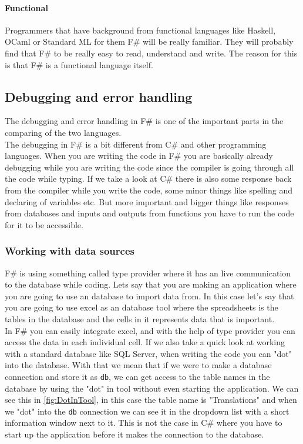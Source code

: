 \documentclass[12pt, a4paper]{article}
\newcommand{\code}[1]{{\small \texttt{#1}}}
\begin{document}
\paragraph{Functional}
Programmers that have background from functional languages like Haskell, OCaml or Standard ML for them F\# will be really familiar. They will probably find that F\# to be really easy to read, understand and write. The reason for this is that F\# is a functional language itself. 

\newpage
\subsection{Debugging and error handling}
The debugging and error handling in F\# is one of the important parts in the comparing of the two languages.\\
 
The debugging in F\# is a bit different from C\# and other programming languages. When you are writing the code in F\# you are basically already debugging while you are writing the code since the compiler is going through all the code while typing. If we take a look at C\# there is also some response back from the compiler while you write the code, some minor things like spelling and declaring of variables etc. But more important and bigger things like responses from databases and inputs and outputs from functions you have to run the code for it to be accessible.


\newpage
\subsubsection{Working with data sources}

F\# is using something called type provider where it has an live communication to the database while coding. Lets say that you are making an application where you are going to use an database to import data from. In this case let's say that you are going to use excel as an database tool where the spreadsheets is the tables in the database and the cells in it represents data that is important. \\

In F\# you can easily integrate excel, and with the help of type provider you can access the data in each individual cell. If we also take a quick look at working with a standard database like SQL Server, when writing the code you can "dot" into the database. With that we mean that if we were to make a database connection and store it as \code{db}, we can get access to the table names in the database by using the "dot" in tool without even starting the application. We can see this in \ref{fig:DotInTool}, in this case the table name is "Translations" and when we "dot" into the \code{db} connection we can see it in the dropdown list with a short information window next to it. This is not the case in C\# where you have to start up the application before it makes the connection to the database.
\end{document}
